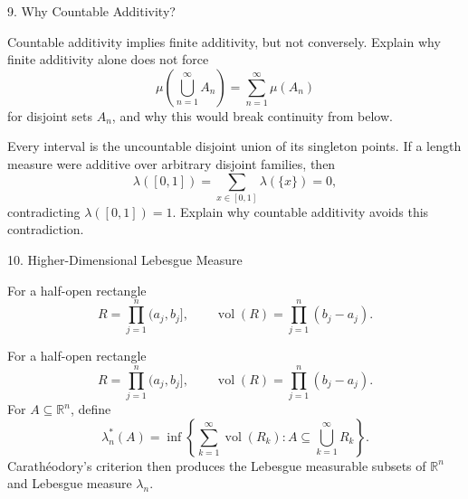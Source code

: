 \documentclass[12pt,a4paper]{article}
\begin{document}
\clearpage

\begin{heading}
    9. Why Countable Additivity?
\end{heading}

\vspace{10pt}

\begin{problem}
    Countable additivity implies finite additivity, but not conversely. Explain why finite additivity alone does not force
    \[
        \mu\!\left(\bigcup_{n=1}^{\infty}A_n\right)
        =\sum_{n=1}^{\infty}\mu(A_n)
    \]
    for disjoint sets $A_n$, and why this would break continuity from below.
\end{problem}

\vspace{50pt}

\begin{problem}
    Every interval is the uncountable disjoint union of its singleton points. If a length measure were additive over arbitrary disjoint families, then
    \[
        \lambda([0,1])=\sum_{x\in[0,1]}\lambda(\{x\})=0,
    \]
    contradicting $\lambda([0,1])=1$. Explain why countable additivity avoids this contradiction.
\end{problem}

\clearpage

\begin{heading}
    10. Higher-Dimensional Lebesgue Measure
\end{heading}

\vspace{10pt}

\begin{definition}
    For a half-open rectangle
    \[
        R=\prod_{j=1}^{n}(a_j,b_j],
        \qquad
        \operatorname{vol}(R)=\prod_{j=1}^{n}(b_j-a_j).
    \]
    
\end{definition}

\clearpage

\begin{definition}
    For a half-open rectangle
    \[
        R=\prod_{j=1}^{n}(a_j,b_j],
        \qquad
        \operatorname{vol}(R)=\prod_{j=1}^{n}(b_j-a_j).
    \]
    For $A\subseteq\mathbb{R}^n$, define
    \[
        \lambda_n^*(A)=
        \inf\left\{
        \sum_{k=1}^{\infty}\operatorname{vol}(R_k):
        A\subseteq\bigcup_{k=1}^{\infty}R_k
        \right\}.
    \]
    Carath\'eodory's criterion then produces the Lebesgue measurable subsets of $\mathbb{R}^n$ and Lebesgue measure $\lambda_n$.
\end{definition}
\end{document}
